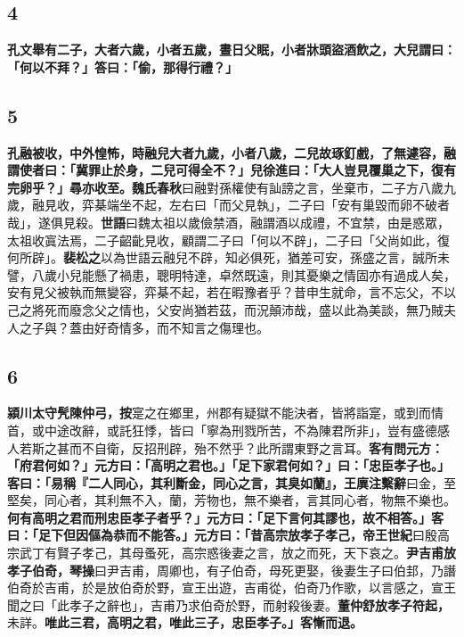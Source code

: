\subsection*{4}

\textbf{孔文舉有二子，大者六歲，小者五歲，晝日父眠，小者牀頭盜酒飲之，大兒謂曰：「何以不拜？」答曰：「偷，那得行禮？」}

\subsection*{5}

\textbf{孔融被收，中外惶怖，時融兒大者九歲，小者八歲，二兒故琢釘戲，了無遽容，融謂使者曰：「冀罪止於身，二兒可得全不？」兒徐進曰：「大人豈見覆巢之下，復有完卵乎？」尋亦收至。}{\footnotesize \textbf{魏氏春秋}曰融對孫權使有訕謗之言，坐棄市，二子方八歲九歲，融見收，弈棊端坐不起，左右曰「而父見執」，二子曰「安有巢毀而卵不破者哉」，遂俱見殺。\textbf{世語}曰魏太祖以歲儉禁酒，融謂酒以成禮，不宜禁，由是惑眾，太祖收寘法焉，二子齠齔見收，顧謂二子曰「何以不辟」，二子曰「父尚如此，復何所辟」。\textbf{裴松之}以為世語云融兒不辟，知必俱死，猶差可安，孫盛之言，誠所未譬，八歲小兒能懸了禍患，聰明特達，卓然既遠，則其憂樂之情固亦有過成人矣，安有見父被執而無變容，弈棊不起，若在暇豫者乎？昔申生就命，言不忘父，不以己之將死而廢念父之情也，父安尚猶若茲，而況顛沛哉，盛以此為美談，無乃賊夫人之子與？蓋由好奇情多，而不知言之傷理也。}

\subsection*{6}

\textbf{潁川太守髠陳仲弓，}{\footnotesize \textbf{按}寔之在鄉里，州郡有疑獄不能決者，皆將詣寔，或到而情首，或中途改辭，或託狂悸，皆曰「寧為刑戮所苦，不為陳君所非」，豈有盛德感人若斯之甚而不自衛，反招刑辟，殆不然乎？此所謂東野之言耳。}\textbf{客有問元方：「府君何如？」元方曰：「高明之君也。」「足下家君何如？」曰：「忠臣孝子也。」客曰：「易稱『二人同心，其利斷金，同心之言，其臭如蘭』，}{\footnotesize \textbf{王廙注繫辭}曰金，至堅矣，同心者，其利無不入，蘭，芳物也，無不樂者，言其同心者，物無不樂也。}\textbf{何有高明之君而刑忠臣孝子者乎？」元方曰：「足下言何其謬也，故不相答。」客曰：「足下但因傴為恭而不能答。」元方曰：「昔高宗放孝子孝己，}{\footnotesize \textbf{帝王世紀}曰殷高宗武丁有賢子孝己，其母蚤死，高宗惑後妻之言，放之而死，天下哀之。}\textbf{尹吉甫放孝子伯奇，}{\footnotesize \textbf{琴操}曰尹吉甫，周卿也，有子伯奇，母死更娶，後妻生子曰伯邽，乃譖伯奇於吉甫，於是放伯奇於野，宣王出遊，吉甫從，伯奇乃作歌，以言感之，宣王聞之曰「此孝子之辭也」，吉甫乃求伯奇於野，而射殺後妻。}\textbf{董仲舒放孝子符起，}{\footnotesize 未詳。}\textbf{唯此三君，高明之君，唯此三子，忠臣孝子。」客慚而退。}

